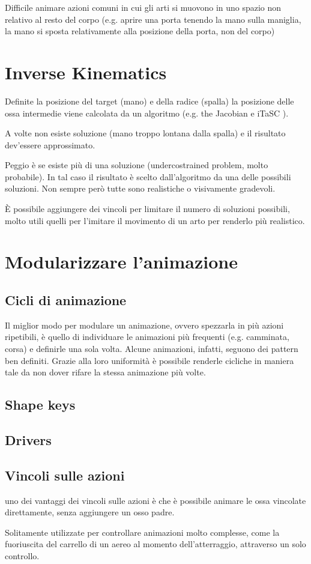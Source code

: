 Difficile animare azioni comuni in cui gli arti si muovono in uno spazio non relativo al resto del corpo (e.g. aprire una porta tenendo la mano sulla maniglia, la mano si sposta relativamente alla posizione della porta, non del corpo)
\section{Inverse Kinematics}
Definite la posizione del target (mano) e della radice (spalla) la posizione delle ossa intermedie viene calcolata da un algoritmo (e.g. the Jacobian \cite{Parent:2012:CAA:2385444} e iTaSC \cite{blendWiki}).

A volte non esiste soluzione (mano troppo lontana dalla spalla) e il risultato dev'essere approssimato.

Peggio è se esiste più di una soluzione (undercostrained problem, molto probabile). In tal caso il risultato è scelto dall'algoritmo da una delle possibili soluzioni. Non sempre però tutte sono realistiche o visivamente gradevoli.

È possibile aggiungere dei vincoli per limitare il numero di soluzioni possibili, molto utili quelli per l'imitare il movimento di un arto per renderlo più realistico.
\section{Modularizzare l'animazione}
\subsection{Cicli di animazione}
Il miglior modo per modulare un animazione, ovvero spezzarla in più azioni ripetibili, è quello di individuare le animazioni più frequenti (e.g. camminata, corsa) e definirle una sola volta.
Alcune animazioni, infatti, seguono dei pattern ben definiti.
Grazie alla loro uniformità è possibile renderle cicliche in maniera tale da non dover rifare la stessa animazione più volte.
\subsection{Shape keys}
\subsection{Drivers}
\subsection{Vincoli sulle azioni}
uno dei vantaggi dei vincoli sulle azioni è che è possibile animare le ossa vincolate direttamente, senza aggiungere un osso padre.

Solitamente utilizzate per controllare animazioni molto complesse, come la fuoriuscita del carrello di un aereo al momento dell'atterraggio, attraverso un solo controllo.

